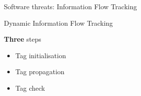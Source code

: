 \begin{frame}{Software threats: Information Flow Tracking}
{\begin{figure}
            \label{fig:offloading}
        \end{figure}
    }
\end{frame}

\begin{frame}{Dynamic Information Flow Tracking}
    \begin{minipage}[c]{0.35\linewidth}
        \begingroup
        \begin{block}{\textbf{Three} steps}
            \begin{itemize}
                \item<1-> Tag initialisation
                \item<2-> Tag propagation
                \item<3-> Tag check
            \end{itemize}
        \end{block}
        \endgroup
    \end{minipage}\hfill%
    \begin{minipage}[c]{0.6\linewidth}
        \begin{figure}
            \centering
            \label{fig:schemaDIFT}
        \end{figure}
    \end{minipage}
\end{frame}
